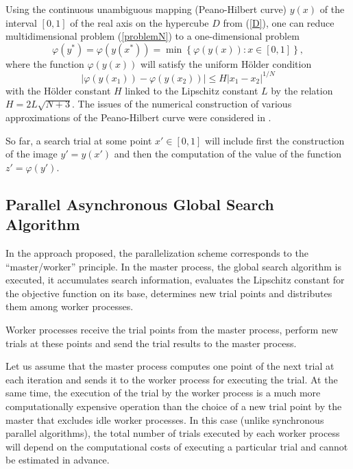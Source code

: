 \documentclass{svproc}
\begin{document}
Using the continuous unambiguous mapping (Peano-Hilbert curve) $y(x)$ of the interval $[0,1]$ of the real axis on the hypercube $D$ from (\ref{D}), one can reduce multidimensional problem (\ref{problemN}) to a one-dimensional problem
\[
\varphi(y^\ast)=\varphi(y(x^\ast))=\min{\left\{\varphi(y(x)): x\in[0,1]\right\}},
\]
where the function $\varphi(y(x))$ will satisfy the uniform H{\"o}lder condition
\[
\left|\varphi(y(x_1))-\varphi(y(x_2))\right|\leq H\left|x_1-x_2\right|^{1/N}
\]
with the H{\"o}lder constant $H$ linked to the Lipschitz constant $L$ by the relation $ H=2 L \sqrt{N+3}$. 
The issues of the numerical construction of various approximations of the Peano-Hilbert curve were considered in \cite{Strongin2000,Sergeyev2013}.

So far, a search trial at some point $x'\in[0,1]$ will include first the construction of the image $y'=y(x')$ and then the computation of the value of the function $z'=\varphi(y')$.


\subsection{Parallel Asynchronous Global Search Algorithm}

In the approach proposed, the parallelization scheme corresponds to the ``master/worker'' principle.
In the master process, the global search algorithm is executed, it accumulates search information, evaluates the Lipschitz constant for the objective function on its base, determines new trial points and distributes them among worker processes. 

Worker processes receive the trial points from the master process, perform new trials at these points and send the trial results to the master process. 

Let us assume that the master process computes one point of the next trial at each iteration and sends it to the worker process for executing the trial. 
At the same time, the execution of the trial by the worker process is a much more computationally expensive operation than the choice of a new trial point by the master that excludes idle worker processes. 
In this case (unlike synchronous parallel algorithms), the total number of trials executed by each worker process will depend on the computational costs of executing a particular trial and cannot be estimated in advance.
\end{document}

